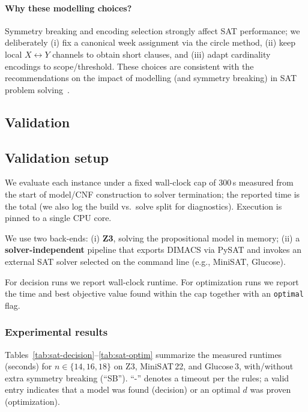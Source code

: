 \documentclass{article}
\begin{document}
\paragraph{Why these modelling choices?}
Symmetry breaking and encoding selection strongly affect SAT performance; we deliberately (i) fix a canonical week assignment via the circle method, (ii) keep local $X\!\leftrightarrow\!Y$ channels to obtain short clauses, and (iii) adapt cardinality encodings to scope/threshold. These choices are consistent with the recommendations on the impact of modelling (and symmetry breaking) in SAT problem solving~\cite{martins-impact-sat-modelling}.

\subsection{Validation}

\subsection*{Validation setup}
We evaluate each instance under a fixed wall-clock cap of $300$\,s measured from the start of model/CNF construction to solver termination; the reported time is the total (we also log the build vs.\ solve split for diagnostics). Execution is pinned to a single CPU core.

We use two back-ends: (i) \textbf{Z3}, solving the propositional model in memory; (ii) a \textbf{solver-independent} pipeline that exports DIMACS via PySAT and invokes an external SAT solver selected on the command line (e.g., MiniSAT, Glucose).

For decision runs we report wall-clock runtime. 
For optimization runs we report the time and best objective value found within the cap 
together with an \texttt{optimal} flag.

\subsubsection*{Experimental results}
Tables~\ref{tab:sat-decision}--\ref{tab:sat-optim} summarize the measured runtimes (seconds) for $n\in\{14,16,18\}$ on Z3, 
MiniSAT\,22, and Glucose\,3, with/without extra symmetry breaking (``SB''). ``-'' denotes a timeout per the rules; 
a valid entry indicates that a model was found (decision) or an optimal $d$ was proven (optimization).
\end{document}
